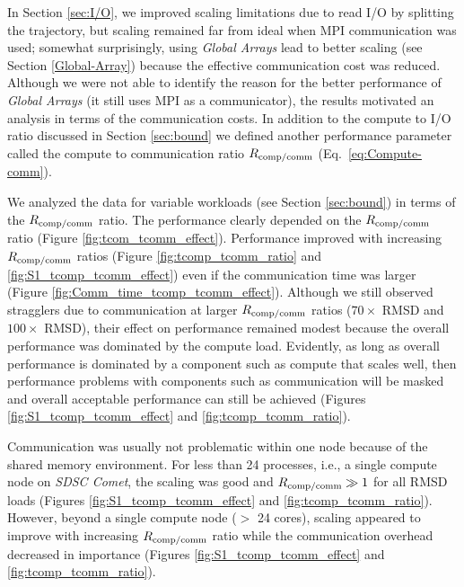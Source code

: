 \label{sec:tcomm}

In Section \ref{sec:I/O}, we improved scaling limitations due to read I/O by splitting the trajectory, but scaling remained far from ideal when MPI communication was used; somewhat surprisingly, using \emph{Global Arrays} lead to better scaling (see Section \ref{Global-Array}) because the effective communication cost was reduced.
Although we were not able to identify the reason for the better performance of \emph{Global Arrays} (it still uses MPI as a communicator), the results motivated an analysis in terms of the communication costs.
In addition to the compute to I/O ratio \RcompIO discussed in Section \ref{sec:bound} we defined another performance parameter called the compute to communication ratio $R_{\text{comp/comm}}$ (Eq.~\ref{eq:Compute-comm}).

We analyzed the data for variable workloads (see Section \ref{sec:bound}) in terms of the $R_{\text{comp/comm}}$ ratio.
The performance clearly depended on the $R_{\text{comp/comm}}$ ratio (Figure \ref{fig:tcom_tcomm_effect}).
Performance improved with increasing $R_{\text{comp/comm}}$ ratios (Figure \ref{fig:tcomp_tcomm_ratio} and \ref{fig:S1_tcomp_tcomm_effect}) even if the communication time was larger (Figure \ref{fig:Comm_time_tcomp_tcomm_effect}).
Although we still observed stragglers due to communication at larger $R_{\text{comp/comm}}$ ratios ($70\times$ RMSD and $100\times$ RMSD), their effect on performance remained modest because the overall performance was dominated by the compute load. 
Evidently, as long as overall performance is dominated by a component such as compute that scales well, then performance problems with components such as communication will be masked and overall acceptable performance can still be achieved (Figures \ref{fig:S1_tcomp_tcomm_effect} and \ref{fig:tcomp_tcomm_ratio}).

Communication was usually not problematic within one node because of the shared memory environment.
For less than 24 processes, i.e., a single compute node on \emph{SDSC Comet}, the scaling was good and $R_{\text{comp/comm}} \gg 1$ for all RMSD loads (Figures \ref{fig:S1_tcomp_tcomm_effect} and \ref{fig:tcomp_tcomm_ratio}).
However, beyond a single compute node ($>$ 24 cores), scaling appeared to improve with increasing $R_{\text{comp/comm}}$ ratio while the communication overhead decreased in importance (Figures \ref{fig:S1_tcomp_tcomm_effect} and \ref{fig:tcomp_tcomm_ratio}).

